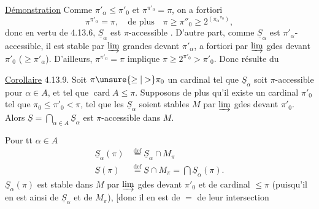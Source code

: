 
\uline{Démonstration}   Comme
$\pi'_\alpha\leq\pi'_0$ et $\pi^{\pi'_0}=\pi$, on
 a fortiori
\[
\pi^{\pi'_\alpha}=\pi,\quad\text{de plus}\quad \pi\geq\pi''_0\geq 2^{({\pi_\alpha}^{\pi_0})},
\]
donc en vertu de 4.13.6, $\underline S_\alpha$ est
$\pi$-accessible . D'autre part, comme $\underline S_\alpha$ est
$\pi'_\alpha$-accessible, il est stable  par $\varinjlim$ grandes
devant $\pi'_\alpha$, a fortiori par $\varinjlim$ gdes devant
$\pi'_0$ ($\geq\pi'_\alpha$). D'ailleurs, $\pi^{\pi'_0}=\pi$ implique
$\pi\geq 2^{\pi'_0}>\pi'_0$. Donc  résulte du

\uline{Corollaire} 4.13.9. Soit $\pi\unsure{\geq|>}\pi_0$ un cardinal
tel que $\underline S_\alpha$ soit $\pi$-accessible  pour 
$\alpha\in A$, et tel que $\operatorname{card} A\leq\pi$. Supposons
de plus qu'il  existe un cardinal
$\pi'_0$ \deleted{$\unsure{\geq}$} tel que $\pi_0\leq\pi'_0<\pi$, tel que les
$\underline S_\alpha$ soient stables  $M$ par $\varinjlim$ gdes
devant $\pi'_0$. Alors $\underline S=\bigcap_{\alpha\in A}\underline S_\alpha$ est $\pi$-accessible dans $M$.

Pour tt $\alpha\in A$
\[
\begin{aligned}
\underline S_\alpha(\pi)&\overset{\mathrm{def}}{=}\underline S_\alpha\cap M_\pi\\
\underline S(\pi)&\overset{\mathrm{def}}{=}\underline S\cap M_\pi=\bigcap\underline S_\alpha(\pi).
\end{aligned}
\]
  $\underline S_\alpha(\pi)$ est stable dans $M$
par $\varinjlim$ gdes devant $\pi'_0$ et de cardinal
$\leq\pi$ (puisqu'il en est ainsi de $\underline S_\alpha$ et de
$M_\pi$), [donc il en est de $=$ de leur intersection
